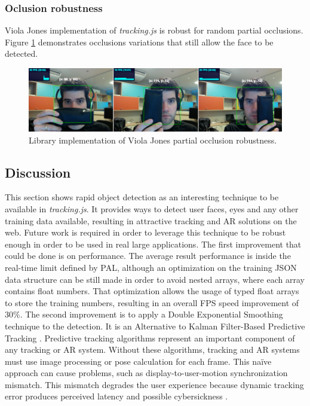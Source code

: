 
\subsubsection{Oclusion robustness} %
\label{subsub:evaluation:rapid_object_detection:results:occlusion_robustness}

Viola Jones implementation of \textit{tracking.js} is robust for random partial occlusions. Figure \ref{figure:viola_occlusion} demonstrates occlusions variations that still allow the face to be detected.

\begin{figure}[!htb]
  \centering
  \includegraphics[width=\linewidth]{chapters/evaluation/viola_occlusion.png}
  \caption{Library implementation of Viola Jones partial occlusion robustness.}
  \label{figure:viola_occlusion}
\end{figure}


\subsection{Discussion} %
\label{sub:evaluation:rapid_object_detection:discussion}

This section shows rapid object detection as an interesting technique to be available in \textit{tracking.js}. It provides ways to detect user faces, eyes and any other training data available, resulting in attractive tracking and AR solutions on the web. Future work is required in order to leverage this technique to be robust enough in order to be used in real large applications. The first improvement that could be done is on performance. The average result performance is inside the real-time limit defined by PAL, although an optimization on the training JSON data structure can be still made in order to avoid nested arrays, where each array contains float numbers. That optimization allows the usage of typed float arrays to store the training numbers, resulting in an overall FPS speed improvement of $30\%$. The second improvement is to apply a Double Exponential Smoothing technique to the detection. It is an Alternative to Kalman Filter-Based Predictive Tracking \cite{LaViola2003}. Predictive tracking algorithms represent an important component of any tracking or AR system. Without these algorithms, tracking and AR systems must use image processing or pose calculation for each frame. This naïve approach can cause problems, such as display-to-user-motion synchronization mismatch. This mismatch degrades the user experience because dynamic tracking error produces perceived latency and possible cybersickness \cite{LaViolaJr.2000}.

